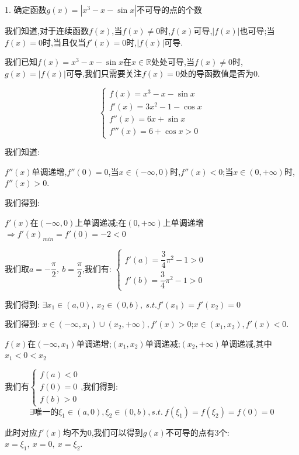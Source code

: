 1. 确定函数$g(x)=|x^3-x-\sin x|$不可导的点的个数
\begin{solution}

	我们知道,对于连续函数$f(x)$,当$f(x)\neq 0$时,$f(x)$可导,$|f(x)|$也可导;当$f(x)=0$时,当且仅当$f'(x)=0$时,$|f(x)|$可导.
	
	我们已知$f(x)=x^3-x-\sin x$在$x\in\mathbb{R}$处处可导,当$f(x)\neq 0$时,$g(x)=|f(x)|$可导,我们只需要关注$f(x)=0$处的导函数值是否为$0$.
	
	$$\left\lbrace
	\begin{array}{l}
		f(x)=x^3-x-\sin x\\
		f'(x)=3x^2-1-\cos x\\
		f''(x)=6x+\sin x\\
		f'''(x)=6+\cos x>0
	\end{array}
	\right. $$
	
	我们知道:  
	
	$f''(x)$单调递增,$f''(0)=0$,当$x\in(-\infty,0)$时,$f''(x)<0$;当$x\in(0,+\infty)$时,$f''(x)>0$.
	
	我们得到:  
	
	$f'(x)$在$(-\infty,0)$上单调递减;在$(0,+\infty)$上单调递增$\Rightarrow f'(x)_{min}=f'(0)=-2<0$
	
	我们取$a=-\dfrac{\pi}{2},\ b=\dfrac{\pi}{2}$,我们有:  $\left\lbrace
	\begin{array}{l}
		f'(a)=\dfrac{3}{4}\pi^2-1>0\\
		f'(b)=\dfrac{3}{4}\pi^2-1>0
	\end{array}
	\right. $
	
	我们得到:  $\exists x_{1}\in(a,0),\ x_{2}\in(0,b),\ s.t. f'(x_{1})=f'(x_{2})=0$
	
	我们得到:  $x\in(-\infty,x_{1})\cup (x_{2},+\infty),f'(x)>0$;$x\in(x_{1},x_{2}),f'(x)<0$.
	
	$f(x)$在$(-\infty,x_{1})$单调递增;$(x_{1},x_{2})$单调递减;$(x_{2},+\infty)$单调递减,其中$x_{1}<0<x_{2}$
	
	我们有$\left\lbrace
	\begin{array}{l}
		f(a)<0\\
		f(0)=0\\
		f(b)>0
	\end{array}
	\right. $,我们得到:  
	$$\exists \text{唯一的}\xi_{1}\in(a,0),\xi_{2}\in(0,b),s.t.\ f(\xi_{1})=f(\xi_{2})=f(0)=0$$
	
	此时对应$f'(x)$均不为$0$,我们可以得到$g(x)$不可导的点有$3$个:  $x=\xi_{1},\ x=0,\ x=\xi_{2}$.
\end{solution}

